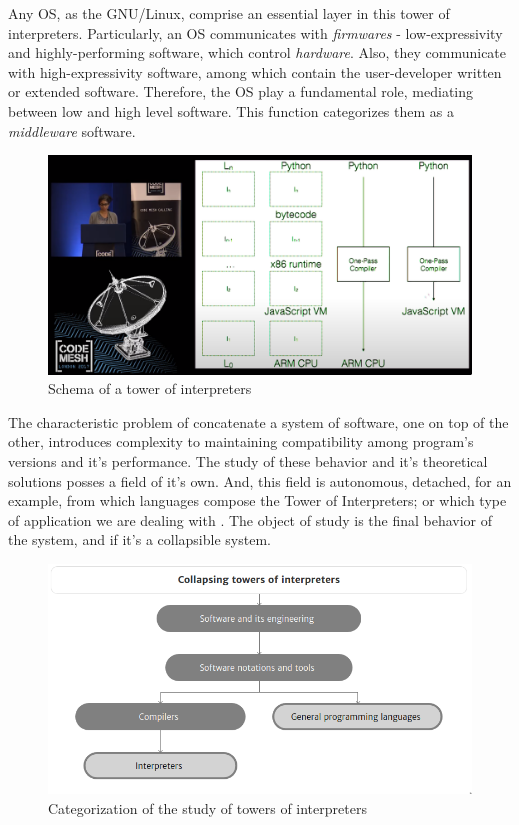 \documentclass[
12pt,				%
openright,			%
oneside,			%
a4paper,			%
brazil,				%
english,			%
]{abntex2}
\begin{document}
Any OS, as the GNU/Linux, comprise an essential layer in this tower of
interpreters. Particularly, an OS communicates with \textit{firmwares}
- low-expressivity and highly-performing software, which control
\textit{hardware}. Also, they communicate with high-expressivity
software, among which contain the user-developer written or extended
software. Therefore, the OS play a fundamental role, mediating between
low and high level software. This function categorizes them as a
\textit{middleware} software.     

\begin{figure}[ht]
  \centering
  \caption{\label{fig:tower} Schema of a tower of interpreters}
  \includegraphics[width=\linewidth]{torres.png}
\end{figure}

The characteristic problem of concatenate a system of software, one on
top of the other, introduces complexity to maintaining compatibility
among program's versions and it's performance. The study of these
behavior and it's theoretical solutions posses a field of it's
own. And, this field is autonomous, detached, for an example, from
which languages compose the Tower of Interpreters; or which type of
application we are dealing with \cite{amin2017towers}. The object of
study is the final behavior of the system, and if it's a collapsible system. 

\begin{figure}[ht]
  \centering
 \caption{\label{fig:tower2} Categorization of the study of towers of interpreters}
  \includegraphics[width=0.5\linewidth]{torres2.png}
\end{figure}
\end{document}
